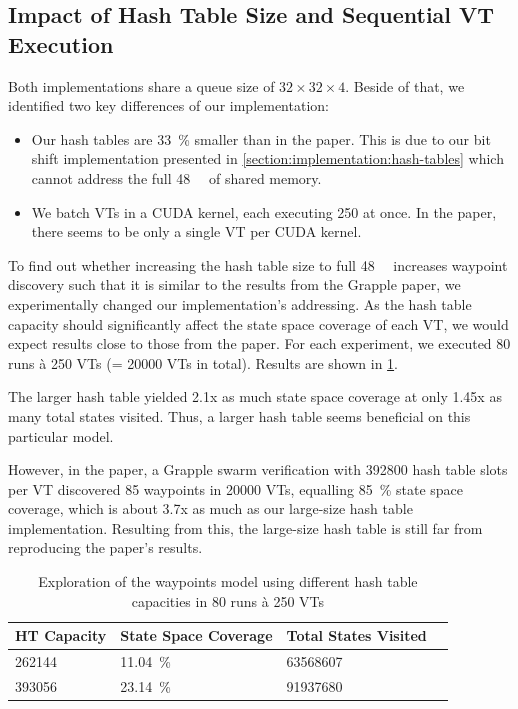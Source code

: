 \documentclass[
fancyheadings, %
%
%
]{stsreprt}
\begin{document}
\subsection{Impact of Hash Table Size and Sequential VT Execution}

Both implementations share a queue size of $32 \times 32 \times 4$.
Beside of that, we identified two key differences of our implementation:

\begin{itemize}
    \item Our hash tables are \SI{33}{\percent} smaller than in the paper.
          This is due to our bit shift implementation presented in \cref{section:implementation:hash-tables} which cannot address the full \SI{48}{\kibi\byte} of shared memory.
    \item We batch VTs in a CUDA kernel, each executing 250 at once.
          In the paper, there seems to be only a single VT per CUDA kernel.
\end{itemize}

To find out whether increasing the hash table size to full \SI{48}{\kibi\byte} increases waypoint discovery such that it is similar to the results from the Grapple paper, we experimentally changed our implementation's addressing.
As the hash table capacity should significantly affect the state space coverage of each VT, we would expect results close to those from the paper.
For each experiment, we executed 80 runs à 250 VTs (= \num{20000} VTs in total).
Results are shown in \cref{table:EXP-02}.

The larger hash table yielded 2.1x as much state space coverage at only 1.45x as many total states visited.
Thus, a larger hash table seems beneficial on this particular model.

However, in the paper, a Grapple swarm verification with \num{392800} hash table slots per VT discovered 85 waypoints in \num{20000} VTs, equalling \SI{85}{\percent} state space coverage, which is about 3.7x as much as our large-size hash table implementation.
Resulting from this, the large-size hash table is still far from reproducing the paper's results.

\begin{table}
    \caption{Exploration of the waypoints model using different hash table capacities in 80 runs à 250 VTs}
    \label{table:EXP-02}
    \centering
    \begin{tabular}{l l l l}
        \toprule
        HT Capacity  & State Space Coverage & Total States Visited \\
        \midrule
        \num{262144} & \SI{11.04}{\percent} & \num{63568607}       \\
        \num{393056} & \SI{23.14}{\percent} & \num{91937680}       \\
        \bottomrule
    \end{tabular}
\end{table}
\end{document}
